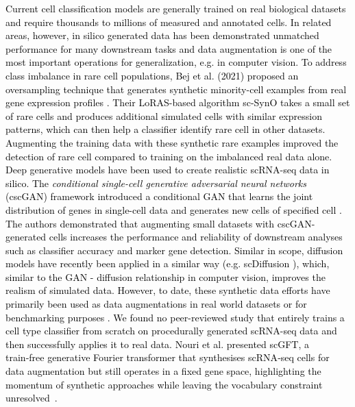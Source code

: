 \documentclass{article}
\newcommand{\gpt}[1]{\textcolor{black}{#1}}
\begin{document}
\gpt{Current cell classification models are generally trained on real biological datasets and require thousands to millions of measured and annotated cells. In related areas, however, in silico generated data has been demonstrated unmatched performance for many downstream tasks \cite{wood20223d, flotho2024t} and data augmentation is one of the most important operations for generalization, e.g. in computer vision. To address class imbalance in rare cell populations, Bej et al. (2021) proposed an oversampling technique that generates synthetic minority-cell examples from real gene expression profiles \cite{bej2021automated}. Their LoRAS-based algorithm sc-SynO takes a small set of rare cells and produces additional simulated cells with similar expression patterns, which can then help a classifier identify rare cell   in other datasets. Augmenting the training data with these synthetic rare examples improved the detection of rare cell   compared to training on the imbalanced real data alone. Deep generative models have been used to create realistic scRNA-seq data in silico. The \textit{conditional single-cell generative adversarial neural networks} (cscGAN) framework introduced a conditional GAN that learns the joint distribution of genes in single-cell data and generates new cells of specified cell   \cite{marouf2020realistic}. The authors demonstrated that augmenting small datasets with cscGAN-generated cells increases the performance and reliability of downstream analyses such as classifier accuracy and marker gene detection. Similar in scope, diffusion models have recently been applied in a similar way (e.g. scDiffusion \cite{luo2024scdiffusion}), which, similar to the GAN - diffusion relationship in computer vision, improves the realism of simulated data. However, to date, these synthetic data efforts have primarily been used as data augmentations in real world datasets or for benchmarking purposes \cite{treppner2021synthetic}. We found no peer-reviewed study that entirely trains a cell type classifier from scratch on procedurally generated scRNA-seq data and then successfully applies it to real data. 
Nouri et al. presented scGFT, a train‑free generative Fourier transformer that synthesises scRNA‑seq cells for data augmentation but still operates in a fixed gene space, highlighting the momentum of synthetic approaches while leaving the vocabulary constraint unresolved \cite{nouri2025single}.}

\end{document}
